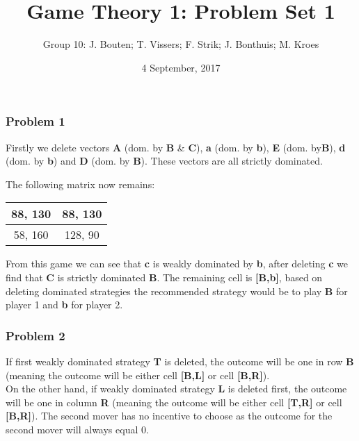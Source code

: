 \documentclass[]{article}
\author{Group 10: J. Bouten; T. Vissers; F. Strik; J. Bonthuis; M. Kroes}
\date{4 September, 2017}
\title{Game Theory 1: Problem Set 1}
\begin{document}
\maketitle



\subsubsection{Problem 1}\label{problem-1}

Firstly we delete vectors \textbf{A} (dom. by \textbf{B} \& \textbf{C}), \textbf{a} (dom. by  \textbf{b}), \textbf{E} (dom. by\textbf{B}), \textbf{d} (dom. by \textbf{b})
and \textbf{D} (dom. by \textbf{B}). These vectors are all strictly dominated.

The following matrix now remains:

\begin{tabular}{| c | c |}
  \hline			
  88, 130 &  88, 130 \\
\hline
  58, 160 & 128, 90 \\
  \hline  
\end{tabular}

From this game we can see that \textbf{c} is weakly dominated by \textbf{b}, after
deleting \textbf{c} we find that \textbf{C} is strictly dominated \textbf{B}. The
remaining cell is \textbf{[B,b]}, based on deleting dominated
strategies the recommended strategy would be to play \textbf{B} for
player 1 and \textbf{b} for player 2.


\subsubsection{Problem 2}\label{problem-2}

If first weakly dominated strategy \textbf{T} is deleted, the outcome will be one in row \textbf{B} (meaning the outcome will be either cell \textbf{[B,L]} or cell \textbf{[B,R]}). \\

On the other hand, if weakly dominated strategy \textbf{L} is deleted first, the outcome will be one in column \textbf{R} (meaning the outcome will be either cell \textbf{[T,R]} or cell \textbf{[B,R]}).
The second mover has no incentive to choose as the outcome for the second mover will always equal 0. \\
\end{document}

